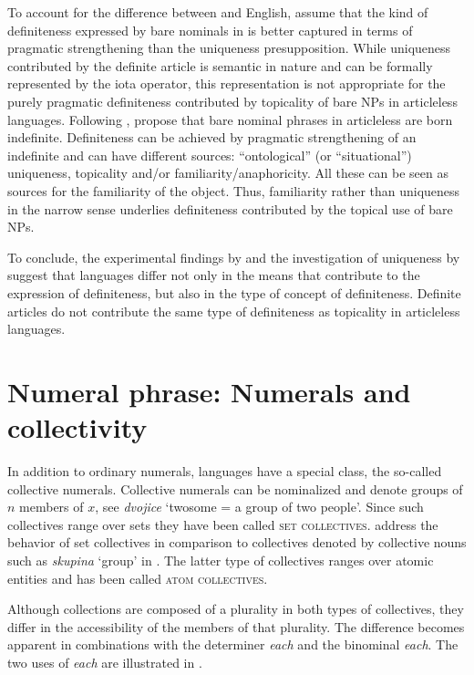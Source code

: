 \documentclass[output=paper]{langscibook}
\begin{document}
\noindent To account for the difference between  and English, \citeauthor{chapters/seres} assume that the kind of definiteness expressed by bare nominals in  is better captured in terms of pragmatic strengthening than the uniqueness presupposition. While uniqueness contributed by the definite article is semantic in nature and can be formally represented by the iota operator, this representation is not appropriate for the purely pragmatic definiteness contributed by topicality of bare NPs in articleless languages. Following \citet{Heim2011}, \citeauthor{chapters/seres} propose that bare nominal phrases in articleless  are born indefinite. Definiteness can be achieved by pragmatic strengthening of an indefinite and can have different sources: ``ontological'' (or ``situational'') uniqueness, topicality and\slash or familiarity\slash anaphoricity. All these can be seen as sources for the familiarity of the object. Thus, familiarity rather than uniqueness in the narrow sense underlies definiteness contributed by the topical use of bare NPs.

To conclude, the experimental findings by \citet{Simik.Demian2020} and the investigation of uniqueness by \citeauthor{chapters/seres} suggest that languages differ not only in the means that contribute to the expression of definiteness, but also in the type of concept of definiteness. Definite articles do not contribute the same type of definiteness as topicality in articleless languages.
\section{Numeral phrase: Numerals and collectivity}

In addition to ordinary numerals,  languages have a special class, the so-called collective numerals. Collective numerals can be nominalized and denote groups of $n$ members of $x$, see  \textit{dvojice} `twosome = a group of two people'. Since such collectives range over sets they have been called \textsc{set collectives}.  address the behavior of set collectives in comparison to collectives denoted by collective nouns such as \textit{skupina} `group' in . The latter type of collectives ranges over atomic entities and has been called \textsc{atom collectives}.

Although collections are composed of a plurality in both types of collectives, they differ in the accessibility of the members of that plurality. The difference becomes apparent in combinations with the determiner \textit{each} and the binominal \textit{each}. The two uses of \textit{each} are illustrated in .
\end{document}

